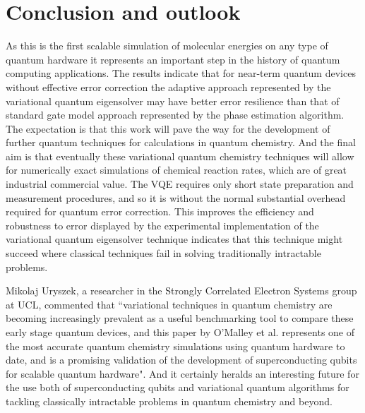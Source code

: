 \documentclass[12pt]{article}
\begin{document}
\section{Conclusion and outlook}

As this is the first scalable simulation of molecular energies on any type of quantum hardware it represents an important step in the history of
quantum computing applications. The results indicate that for near-term quantum devices without effective error correction the adaptive approach
represented by the variational quantum eigensolver may have better error resilience than that of standard gate model approach represented by the
phase estimation algorithm. The expectation is that this work will pave the way for the development of further quantum techniques for calculations
 in quantum chemistry. And the final aim is that eventually these variational quantum chemistry techniques will allow for numerically exact simulations
  of chemical reaction rates, which are of great industrial commercial value. The VQE requires only short state preparation
 and measurement procedures, and so it is without the normal substantial overhead required for quantum error correction. This improves the efficiency
 and robustness to error displayed by the experimental implementation of the variational quantum eigensolver technique indicates that this technique
  might succeed where classical techniques fail in solving traditionally intractable problems.

 Mikolaj Uryszek, a researcher in the Strongly Correlated Electron Systems group at UCL, commented that ``variational techniques in quantum chemistry
 are becoming increasingly prevalent as a useful benchmarking tool to compare these early stage quantum devices, and this paper by O’Malley et al.
 represents one of the most accurate quantum chemistry simulations using quantum hardware to date, and is a promising validation of the
  development of superconducting qubits for scalable quantum hardware". And it certainly heralds an interesting future for the use both of
  superconducting qubits and variational quantum algorithms for tackling classically intractable problems in quantum chemistry and beyond.
\end{document}
